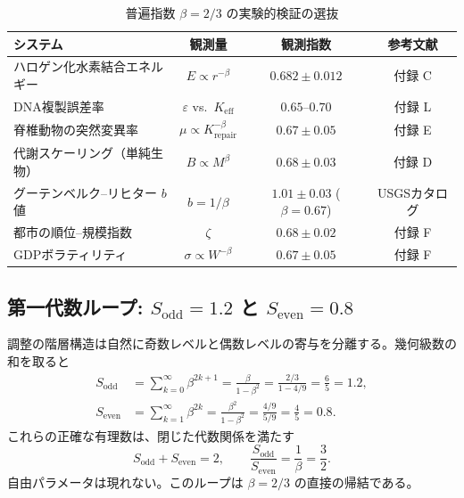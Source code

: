 \documentclass[12pt,a4paper]{article}
\begin{document}
	\begin{table}[htbp]
		\centering
		\caption{普遍指数 \(\beta = 2/3\) の実験的検証の選抜}
		\label{tab:beta-evidence}
		\small
		\begin{tabular}{l c c c}
			\toprule
			システム & 観測量 & 観測指数 & 参考文献 \\
			\midrule
			ハロゲン化水素結合エネルギー & \(E \propto r^{-\beta}\) & \(0.682 \pm 0.012\) & 付録 C \\
			DNA複製誤差率 & \(\varepsilon\) vs.\ \(K_{\mathrm{eff}}\) & \(0.65\text{--}0.70\) & 付録 L \\
			脊椎動物の突然変異率 & \(\mu \propto K_{\mathrm{repair}}^{-\beta}\) & \(0.67 \pm 0.05\) & 付録 E \\
			代謝スケーリング（単純生物） & \(B \propto M^{\beta}\) & \(0.68 \pm 0.03\) & 付録 D \\
			グーテンベルク–リヒター \(b\) 値 & \(b = 1/\beta\) & \(1.01 \pm 0.03\) (\(\beta=0.67\)) & USGSカタログ \\
			都市の順位–規模指数 & \(\zeta\) & \(0.68 \pm 0.02\) & 付録 F \\
			GDPボラティリティ & \(\sigma \propto W^{-\beta}\) & \(0.67 \pm 0.05\) & 付録 F \\
			\bottomrule
		\end{tabular}
	\end{table}
	
	\subsection{第一代数ループ: \(S_{\mathrm{odd}} = 1.2\) と \(S_{\mathrm{even}} = 0.8\)}
	\label{sec:algebraic-loop}
	
	調整の階層構造は自然に奇数レベルと偶数レベルの寄与を分離する。幾何級数の和を取ると
	\begin{align}
		S_{\mathrm{odd}} &= \sum_{k=0}^{\infty} \beta^{2k+1} = \frac{\beta}{1-\beta^{2}} = \frac{2/3}{1 - 4/9} = \frac{6}{5} = 1.2, \label{eq:sodd}\\
		S_{\mathrm{even}} &= \sum_{k=1}^{\infty} \beta^{2k} = \frac{\beta^{2}}{1-\beta^{2}} = \frac{4/9}{5/9} = \frac{4}{5} = 0.8. \label{eq:seven}
	\end{align}
	これらの正確な有理数は、閉じた代数関係を満たす
	\begin{equation}
		\boxed{S_{\mathrm{odd}} + S_{\mathrm{even}} = 2, \qquad \frac{S_{\mathrm{odd}}}{S_{\mathrm{even}}} = \frac{1}{\beta} = \frac{3}{2}}.
		\label{eq:algebraic-loop}
	\end{equation}
	自由パラメータは現れない。このループは \(\beta = 2/3\) の直接の帰結である。
	
\end{document}
